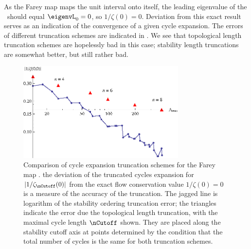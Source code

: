 As the Farey map maps the unit interval onto itself, the leading eigenvalue of
the \FPoper\ should equal $\eigenvL_0=0$, so
$1/\zeta(0)=0$. Deviation from this exact result serves as an indication
of the convergence of a given cycle expansion.
The errors of different truncation
schemes are indicated in .
We see that topological length truncation schemes are hopelessly
bad in this case; stability length truncations are somewhat better,
but still rather bad.

\begin{figure}
\begin{center}
	\includegraphics[width=0.75\textwidth]{figs/fareyZeta}
\end{center}
\caption[Cycle expansion truncation schemes for the Farey map]
        {
Comparison of cycle expansion truncation schemes for the
Farey map .
the deviation of the truncated cycles
expansion for $|1/\zeta_\nCutoff(0)|$ from the exact
flow conservation value $1/\zeta(0)=0$ is a measure of the accuracy of the
truncation.  The jagged
line is logarithm of the stability ordering
truncation error; the triangles indicate the error
due the topological length truncation, with
the maximal cycle length $\nCutoff$ shown.
They are placed along the stability cutoff axis at points determined
by the condition that the total number of cycles is the same for both
truncation schemes.
        }
\label{fig:logStabOrder}
\end{figure}
